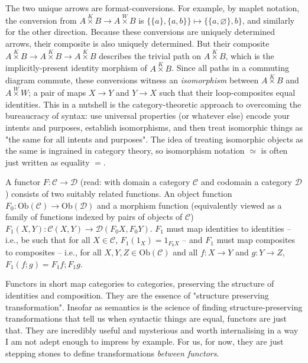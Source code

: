 The two unique arrows are format-conversions. For example, by maplet notation, the conversion from $A \overset{K}{\times} B \rightarrow A \overset{W}{\times} B$ is $\{\{a\},\{a,b\}\} \mapsto \{\{a,\varnothing\},b\}$, and similarly for the other direction. Because these conversions are uniquely determined arrows, their composite is also uniquely determined. But their composite $A \overset{K}{\times} B \rightarrow A \overset{K}{\times} B \rightarrow A \overset{K}{\times} B$ describes the trivial path on $A \overset{K}{\times} B$, which is the implicitly-present identity morphism of $A \overset{K}{\times} B$. Since all paths in a commuting diagram commute, these conversions witness an \emph{isomorphism} between $A \overset{K}{\times} B$ and $A \overset{W}{\times} W$; a pair of maps $X \rightarrow Y$ and $Y \rightarrow X$ such that their loop-composites equal identities. This in a nutshell is the category-theoretic approach to overcoming the bureaucracy of syntax: use universal properties (or whatever else) encode your intents and purposes, establish isomorphisms, and then treat isomorphic things as "the same for all intents and purposes". The idea of treating isomorphic objects as the same is ingrained in category theory, so isomorphism notation $\simeq$ is often just written as equality $=$.

\begin{defn}[Functor]
A functor $F: \mathcal{C} \rightarrow \mathcal{D}$ (read: with domain a category $\mathcal{C}$ and codomain a category $\mathcal{D}$) consists of two suitably related functions. An object function $F_0 : \text{Ob}(\mathcal{C}) \rightarrow \text{Ob}(\mathcal{D})$ and a morphism function (equivalently viewed as a family of functions indexed by pairs of objects of $\mathcal{C}$) $F_1(X,Y) : \mathcal{C}(X,Y) \rightarrow \mathcal{D}(F_0 X,F_0 Y )$. $F_1$ must map identities to identities -- i.e., be such that for all $X \in \mathcal{C}$, $F_1(1_X) = 1_{F_0 X}$ -- and $F_1$ must map composites to composites -- i.e., for all $X,Y,Z \in \text{Ob}(\mathcal{C})$ and all $f: X \rightarrow Y$ and $g: Y \rightarrow Z$, $F_1 (f;g) = F_1 f ; F_1 g$.
\end{defn}

Functors in short map categories to categories, preserving the structure of identities and composition. They are the essence of "structure preserving transformation". Insofar as semantics is the science of finding structure-preserving transformations that tell us when syntactic things are equal, functors are just that. They are incredibly useful and mysterious and worth internalising in a way I am not adept enough to impress by example. For us, for now, they are just stepping stones to define transformations \emph{between functors}.

